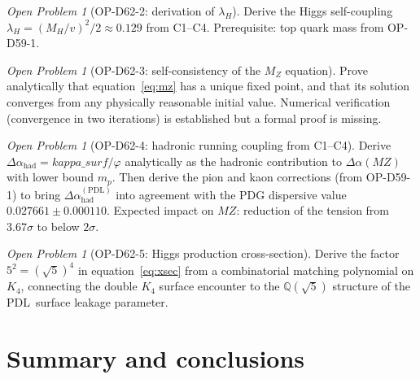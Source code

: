 \documentclass[12pt,a4paper]{article}
\theoremstyle{remark}
\newtheorem{openproblem}[theorem]{Open Problem}
\newcommand{\PDL}{\textsc{pdl}}
\newcommand{\Qphi}{\mathbb{Q}(\sqrt{5})}
\newcommand{\ksurf}{\kappa_{\mathrm{surf}}}
\newcommand{\Dahad}{\Delta\alpha_{\mathrm{had}}}
\newcommand{\MZ}{M_{Z}}
\newcommand{\mproton}{m_{p}}
\def\PDL{PDL}%
\def\MZ{MZ}%
\def\ksurf{kappa\_surf}%
\begin{document}
\begin{openproblem}[OP-D62-2: derivation of $\lambda_H$]\label{op:2}
Derive the Higgs self-coupling $\lambda_{H}=(M_{H}/v)^{2}/2\approx0.129$
from C1--C4. Prerequisite: top quark mass from OP-D59-1.
\end{openproblem}

\begin{openproblem}[OP-D62-3: self-consistency of the $M_Z$ equation]\label{op:3}
Prove analytically that equation~\eqref{eq:mz} has a unique fixed point, and
that its solution converges from any physically reasonable initial value.
Numerical verification (convergence in two iterations) is established but a
formal proof is missing.
\end{openproblem}

\begin{openproblem}[OP-D62-4: hadronic running coupling from C1--C4]\label{op:4}
Derive $\Dahad=\ksurf/\varphi$ analytically as the hadronic contribution to
$\Delta\alpha(\MZ)$ with lower bound $\mproton$. Then derive the pion and kaon
corrections (from OP-D59-1) to bring $\Dahad^{(\mathrm{PDL})}$ into agreement
with the PDG dispersive value $0.027661\pm0.000110$. Expected impact on $\MZ$:
reduction of the tension from $3.67\sigma$ to below $2\sigma$.
\end{openproblem}

\begin{openproblem}[OP-D62-5: Higgs production cross-section]\label{op:5}
Derive the factor $5^{2}=(\sqrt{5})^{4}$ in equation~\eqref{eq:xsec} from a
combinatorial matching polynomial on $K_4$, connecting the double $K_4$ surface
encounter to the $\Qphi$ structure of the \PDL\ surface leakage parameter.
\end{openproblem}

\section{Summary and conclusions}
\end{document}
